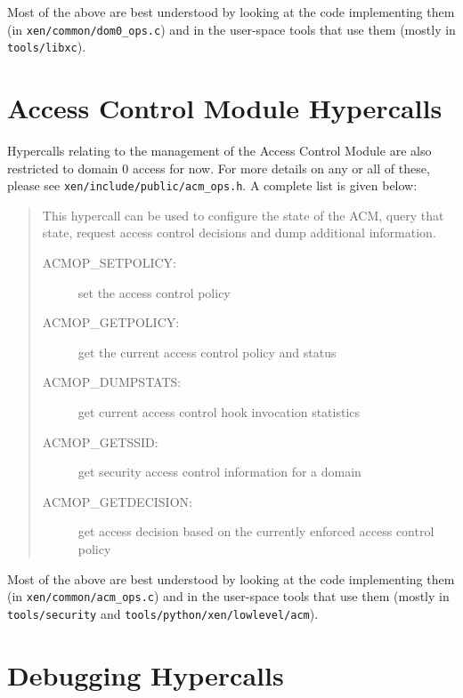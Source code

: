 \documentclass[11pt,twoside,final,openright,a4paper]{report}
\newcommand{\hypercall}[1]{\vspace{2mm}{\sf #1}}
\begin{document}
Most of the above are best understood by looking at the code 
implementing them (in {\tt xen/common/dom0\_ops.c}) and in 
the user-space tools that use them (mostly in {\tt tools/libxc}). 

\section{Access Control Module Hypercalls}
\label{s:acmops}

Hypercalls relating to the management of the Access Control Module are
also restricted to domain 0 access for now. For more details on any or
all of these, please see {\tt xen/include/public/acm\_ops.h}.  A
complete list is given below:

\begin{quote}

\hypercall{acm\_op(int cmd, void *args)}

This hypercall can be used to configure the state of the ACM, query
that state, request access control decisions and dump additional
information.

\begin{description}

\item [ACMOP\_SETPOLICY:] set the access control policy

\item [ACMOP\_GETPOLICY:] get the current access control policy and
  status

\item [ACMOP\_DUMPSTATS:] get current access control hook invocation
  statistics

\item [ACMOP\_GETSSID:] get security access control information for a
  domain

\item [ACMOP\_GETDECISION:] get access decision based on the currently
  enforced access control policy

\end{description}
\end{quote}

Most of the above are best understood by looking at the code
implementing them (in {\tt xen/common/acm\_ops.c}) and in the
user-space tools that use them (mostly in {\tt tools/security} and
{\tt tools/python/xen/lowlevel/acm}).


\section{Debugging Hypercalls} 
\end{document}
